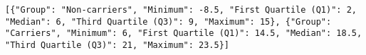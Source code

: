 \begin{verbatim}
[{"Group": "Non-carriers", "Minimum": -8.5, "First Quartile (Q1)": 2, "Median": 6, "Third Quartile (Q3)": 9, "Maximum": 15}, {"Group": "Carriers", "Minimum": 6, "First Quartile (Q1)": 14.5, "Median": 18.5, "Third Quartile (Q3)": 21, "Maximum": 23.5}]
\end{verbatim}
